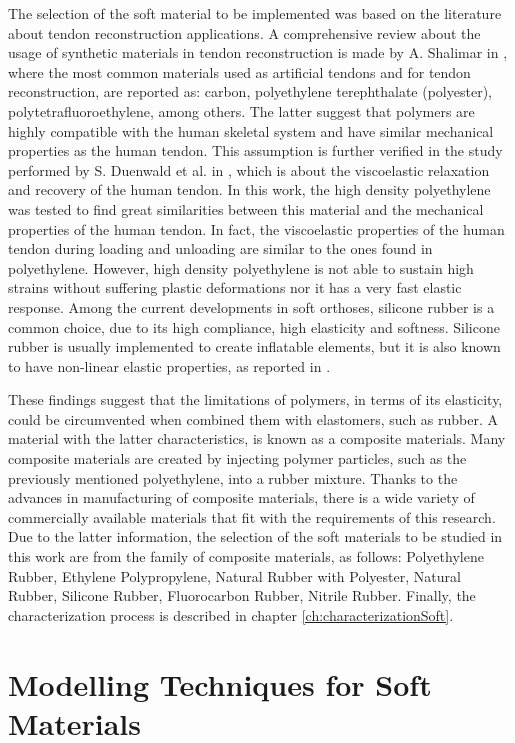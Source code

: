 The selection of the soft material to be implemented was based on the literature about tendon reconstruction applications. A comprehensive review about the usage of synthetic materials in tendon reconstruction is made by A. Shalimar in \cite{abdullah2015usage}, where the most common materials used as artificial tendons and for tendon reconstruction, are reported as: carbon, polyethylene terephthalate (polyester), polytetrafluoroethylene, among others. The latter suggest that polymers are highly compatible with the human skeletal system and have similar mechanical properties as the human tendon. This assumption is further verified in the study performed by S. Duenwald et al. in \cite{duenwald2009viscoelastic}, which is about the viscoelastic relaxation and recovery of the human tendon. In this work, the high density polyethylene was tested to find great similarities between this material and the mechanical properties of the human tendon. In fact, the viscoelastic properties of the human tendon during loading and unloading are similar to the ones found in polyethylene. However, high density polyethylene is not able to sustain high strains without suffering plastic deformations nor it has a very fast elastic response.
Among the current developments in soft orthoses, silicone rubber is a common choice, due to its high compliance, high elasticity and softness. Silicone rubber is usually implemented to create inflatable elements, but it is also known to have non-linear elastic properties, as reported in \cite{roylance2008mechanical}. 

These findings suggest that the limitations of polymers, in terms of its elasticity, could be circumvented when combined them with elastomers, such as rubber. A material with the latter characteristics, is known as a composite materials. Many composite materials are created by injecting polymer particles, such as the previously mentioned polyethylene, into a rubber mixture. Thanks to the advances in manufacturing of composite materials, there is a wide variety of commercially available materials that fit with the requirements of this research. Due to the latter information, the selection of the soft materials to be studied in this work are from the family of composite materials, as follows: Polyethylene Rubber, Ethylene Polypropylene, Natural Rubber with Polyester, Natural Rubber, Silicone Rubber, Fluorocarbon Rubber, Nitrile Rubber. Finally, the characterization process is described in chapter \autoref{ch:characterizationSoft}.

\section{Modelling Techniques for Soft Materials}

